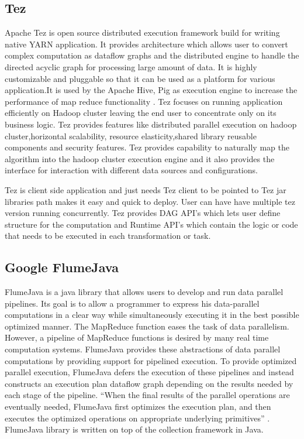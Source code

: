\subsection{Tez}

    Apache Tez is open source distributed execution framework build
    for writing native YARN application. It provides architecture
    which allows user to convert complex computation as dataflow
    graphs and the distributed engine to handle the directed acyclic
    graph for processing large amount of data. It is highly
    customizable and pluggable so that it can be used as a platform
    for various application.It is used by the Apache Hive, Pig as
    execution engine to increase the performance of map reduce
    functionality \cite{www-apache-tez}. Tez focuses on running
    application efficiently on Hadoop cluster leaving the end user to
    concentrate only on its business logic. Tez provides features like
    distributed parallel execution on hadoop cluster,horizontal
    scalability, resource elasticity,shared library reusable
    components and security features. Tez provides capability to
    naturally map the algorithm into the hadoop cluster execution
    engine and it also provides the interface for interaction with
    different data sources and configurations.
	
    Tez is client side application and just needs Tez client to be
    pointed to Tez jar libraries path makes it easy and quick to
    deploy. User can have have multiple tez version running
    concurrently. Tez provides DAG API's which lets user define
    structure for the computation and Runtime API's which contain the
    logic or code that needs to be executed in each transformation or
    task.

\subsection{Google FlumeJava}

    FlumeJava \cite{www-flumejava-google} is a java library that
    allows users to develop and run data parallel pipelines. Its goal
    is to allow a programmer to express his data-parallel computations
    in a clear way while simultaneously executing it in the best
    possible optimized manner. The MapReduce function eases the task
    of data parallelism. However, a pipeline of MapReduce functions is
    desired by many real time computation systems. FlumeJava provides
    these abstractions of data parallel computations by providing
    support for pipelined execution. To provide optimized parallel
    execution, FlumeJava defers the execution of these pipelines and
    instead constructs an execution plan dataflow graph depending on
    the results needed by each stage of the pipeline. ``When the final
    results of the parallel operations are eventually needed,
    FlumeJava first optimizes the execution plan, and then executes
    the optimized operations on appropriate underlying primitives''
    \cite{flumejava-paper}. FlumeJava library is written on top of
    the collection framework in Java.

